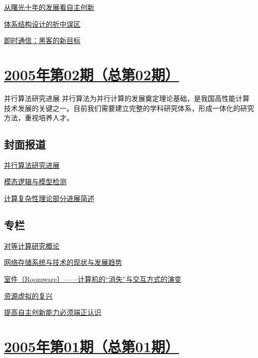 \documentclass[a4paper]{article}
\begin{document}
\href{http://history.ccf.org.cn/resources/1190201776262/2010/04/15/003066.pdf}{从曙光十年的发展看自主创新}

\href{http://history.ccf.org.cn/resources/1190201776262/2010/04/15/003068.pdf}{体系结构设计的折中误区}

\href{http://history.ccf.org.cn/resources/1190201776262/2010/04/15/003075.pdf}{即时通信：黑客的新目标}


\section{\href{http://history.ccf.org.cn/sites/ccf/jsjtbbd.jsp?contentId=2542567628923}{\textbf{2005年第02期（总第02期）}}}
并行算法研究进展 并行算法为并行计算的发展奠定理论基础，是我国高性能计算技术发展的关键之一。目前我们需要建立完整的学科研究体系，形成一体化的研究方法，重视培养人才。
\subsection{封面报道}
\href{http://history.ccf.org.cn/resources/1190201776262/2010/04/15/002018.pdf}{并行算法研究进展}

\href{http://history.ccf.org.cn/resources/1190201776262/2010/04/15/002022.pdf}{模态逻辑与模型检测}

\href{http://history.ccf.org.cn/resources/1190201776262/2010/04/15/002027.pdf}{计算复杂性理论部分进展简述}

\subsection{专栏}
\href{http://history.ccf.org.cn/resources/1190201776262/2010/04/15/002038.pdf}{对等计算研究概论}

\href{http://history.ccf.org.cn/resources/1190201776262/2010/04/15/002054.pdf}{网络存储系统与技术的现状与发展趋势}

\href{http://history.ccf.org.cn/resources/1190201776262/2010/04/15/002065.pdf}{室件（Roomware）——计算机的“消失”与交互方式的演变}

\href{http://history.ccf.org.cn/resources/1190201776262/2010/04/15/002073.pdf}{资源虚拟的复兴}

\href{http://history.ccf.org.cn/resources/1190201776262/2010/04/15/002078.pdf}{提高自主创新能力必须端正认识}


\section{\href{http://history.ccf.org.cn/sites/ccf/jsjtbbd.jsp?contentId=2542567628885}{\textbf{2005年第01期（总第01期）}}}
\end{document}
